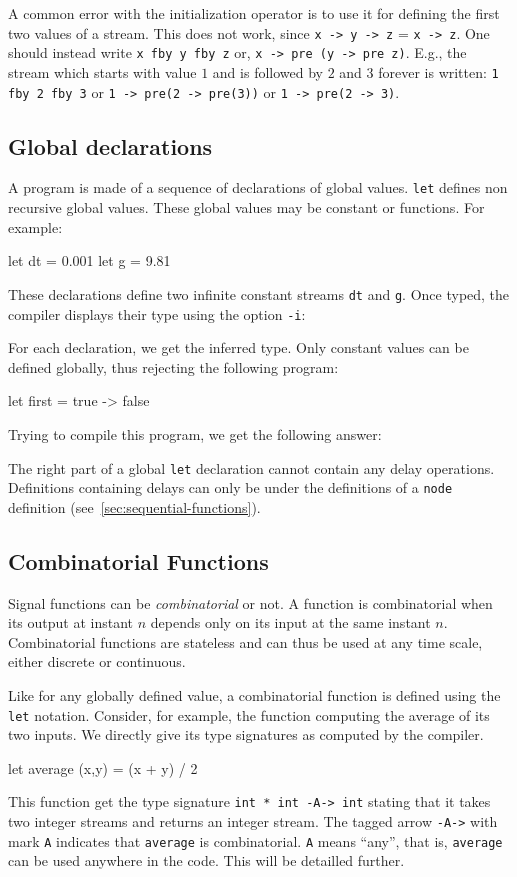 \documentclass[11pt,titlepage,twoside]{report}
\newenvironment{sample}
  {\begin{flushright}\begin{minipage}[t]{15cm}\begin{alltt}}
  {\end{alltt}\end{minipage}\end{flushright}}
\begin{document}
\medskip{} A common error with the initialization
operator is to use it for defining the first two values of a
stream. This does not work, since \verb+x -> y -> z+ =
\verb+x -> z+. One should instead write \verb-x fby y fby z- or,
\verb+x -> pre (y -> pre z)+. E.g., the stream which starts with value
$1$ and is followed by $2$ and $3$ forever is written: \verb-1 fby 2 fby 3-
or \verb+1 -> pre(2 -> pre(3))+ or \verb+1 -> pre(2 -> 3)+.

\subsection{Global declarations}
A program is made of a sequence of declarations of global
values. \verb-let- defines non recursive global values. These global values may
be constant or functions. For example:
\begin{runverbatim}
let dt = 0.001
let g = 9.81
\end{runverbatim}
These declarations define two infinite constant streams \verb-dt- and
\verb-g-. Once typed, the compiler displays their type using the option {\tt -i}:
\begin{sample}\runverbatimcmd\end{sample}
\runverbatimmsg{}
For each declaration, we get the inferred type.
Only constant values can be defined globally, thus rejecting the
following program:
\begin{runverbatim}[fail]
let first = true -> false
\end{runverbatim}
Trying to compile this program, we get the following answer:
\begin{sample}\runverbatimcmd\end{sample}
\runverbatimerr{}
The right part of a global \verb-let- declaration cannot contain any
delay operations. Definitions containing delays can only be under the
definitions of a {\tt node} definition (see~\ref{sec:sequential-functions}).

\subsection{Combinatorial Functions}
Signal functions can be {\em combinatorial} or not.
A function is combinatorial when its output at
instant $n$ depends only on its input at the same instant $n$. Combinatorial
functions are stateless and can thus be used at any time scale, either
discrete or continuous.

Like for any globally defined value, a combinatorial function
is defined using the {\tt let} notation.
Consider, for example, the function computing the
average of its two inputs. We directly give its type
signatures as computed by the compiler.
\begin{runverbatim}[withresult]
let average (x,y) = (x + y) / 2
\end{runverbatim}
This function get the type signature \verb+int * int -A-> int+ stating
that it takes two integer streams and returns an integer stream. The
tagged arrow \texttt{-A->} with mark \texttt{A} indicates that
\texttt{average} is combinatorial. \texttt{A} means ``any'', that is,
\texttt{average} can be used anywhere in the code. This will be
detailled further.
\end{document}
